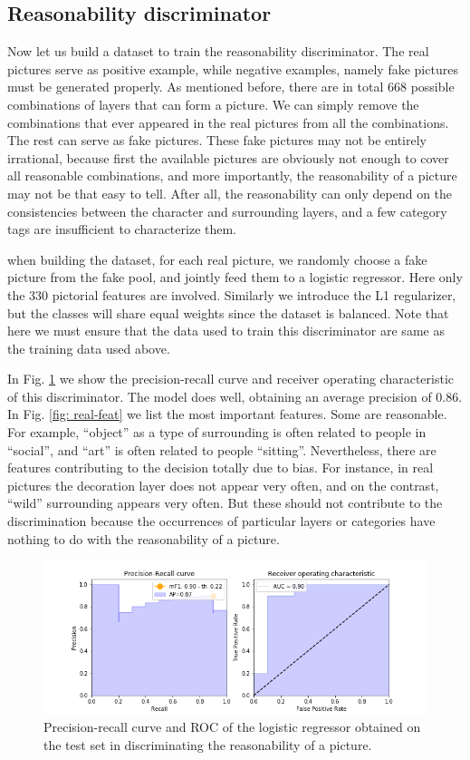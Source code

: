 \documentclass{article} %
\begin{document}
\subsection{Reasonability discriminator}
Now let us build a dataset to train the reasonability discriminator. The real pictures serve as positive example, while negative examples, namely fake pictures must be generated properly. As mentioned before, there are in total 668 possible combinations of layers that can form a picture. We can simply remove the combinations that ever appeared in the real pictures from all the combinations. The rest can serve as fake pictures. These fake pictures may not be entirely irrational, because first the available pictures are obviously not enough to cover all reasonable combinations, and more importantly, the reasonability of a picture may not be that easy to tell. After all, the reasonability can only depend on the consistencies between the character and surrounding layers, and a few category tags are insufficient to characterize them.

when building the dataset, for each real picture, we randomly choose a fake picture from the fake pool, and jointly feed them to a logistic regressor. Here only the 330 pictorial features are involved.  Similarly we introduce the L1 regularizer, but the classes will share equal weights since the dataset is balanced. Note that here we must ensure that the data used to train this discriminator are same as the training data used above.

In Fig. \ref{fig: real-metric} we show the precision-recall curve and receiver operating characteristic of this discriminator. The model does well, obtaining an average precision of 0.86. In Fig. \ref{fig: real-feat} we list the most important features. Some are reasonable. For example, ``object'' as a type of surrounding is often related to people in ``social'', and ``art'' is often related to people ``sitting''. Nevertheless, there are features contributing to the decision totally due to bias. For instance, in real pictures the decoration layer does not appear very often, and on the contrast, ``wild'' surrounding appears very often. But these should not contribute to the discrimination because the occurrences of particular layers or categories have nothing to do with the reasonability of a picture.

\begin{figure}
	\centering
	\includegraphics[width=\textwidth]{../results/realityROC_temp}
	\caption{Precision-recall curve and ROC of the logistic regressor obtained on the test set in discriminating the reasonability of a picture.}
	\label{fig: real-metric}
\end{figure}
\end{document}
